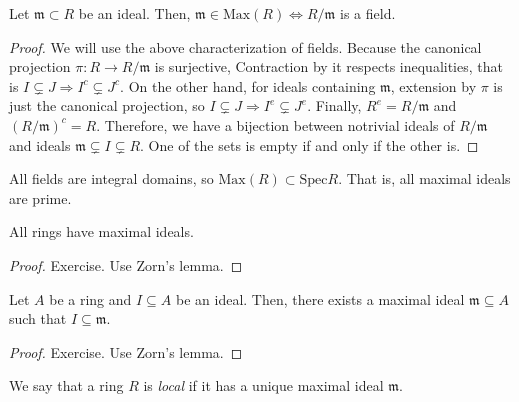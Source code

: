         \begin{prop}
            Let $\mathfrak{m} \subset R$ be an ideal.
            Then, $\mathfrak{m} \in \text{Max}(R) \Leftrightarrow R/\mathfrak{m}$ is a field.
        \end{prop}

            \begin{proof}
                We will use the above characterization of fields.
                Because the canonical projection $\pi: R \rightarrow R/\mathfrak{m}$ is surjective,
                Contraction by it respects inequalities, that is $I \subsetneq J \Rightarrow I^c \subsetneq J^c$.
                On the other hand, for ideals containing $\mathfrak{m}$, extension by $\pi$ is just the canonical projection,
                so $I \subsetneq J \Rightarrow I^e \subsetneq J^e$.
                Finally, $R^e = R/\mathfrak{m}$ and $(R/\mathfrak{m})^c = R$.
                Therefore, we have a bijection between notrivial ideals of $R/\mathfrak{m}$
                and ideals $\mathfrak{m} \subsetneq I \subsetneq R$.
                One of the sets is empty if and only if the other is.
            \end{proof}

        \begin{rk}
            All fields are integral domains, so $\text{Max}(R) \subset \text{Spec}R$.
            That is, all maximal ideals are prime.
        \end{rk}

        \begin{theorem}
            All rings have maximal ideals.
        \end{theorem}
            \begin{proof}
                Exercise.
                Use Zorn's lemma.
            \end{proof}

        \begin{theorem}
            Let $A$ be a ring and $I \subseteq A$ be an ideal.
            Then, there exists a maximal ideal $\mathfrak{m} \subseteq A$ such that $I \subseteq \mathfrak{m}$.
        \end{theorem}
            \begin{proof}
                Exercise.
                Use Zorn's lemma.
            \end{proof}

        \begin{defn}
            We say that a ring $R$ is \emph{local} if it has a unique maximal ideal $\mathfrak{m}$.
        \end{defn}

